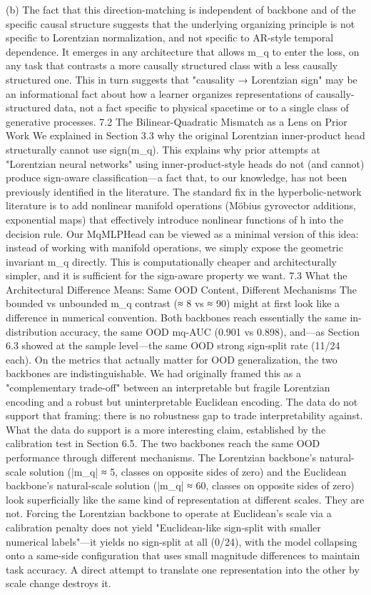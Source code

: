 (b) The fact that this direction-matching is independent of backbone and of the specific causal structure suggests that the underlying organizing principle is not specific to Lorentzian normalization, and not specific to AR-style temporal dependence. It emerges in any architecture that allows m_q to enter the loss, on any task that contrasts a more causally structured class with a less causally structured one. This in turn suggests that "causality → Lorentzian sign" may be an informational fact about how a learner organizes representations of causally-structured data, not a fact specific to physical spacetime or to a single class of generative processes.
7.2 The Bilinear-Quadratic Mismatch as a Lens on Prior Work
We explained in Section 3.3 why the original Lorentzian inner-product head structurally cannot use sign(m_q). This explains why prior attempts at "Lorentzian neural networks" using inner-product-style heads do not (and cannot) produce sign-aware classification—a fact that, to our knowledge, has not been previously identified in the literature.
The standard fix in the hyperbolic-network literature is to add nonlinear manifold operations (Möbius gyrovector additions, exponential maps) that effectively introduce nonlinear functions of h into the decision rule. Our MqMLPHead can be viewed as a minimal version of this idea: instead of working with manifold operations, we simply expose the geometric invariant m_q directly. This is computationally cheaper and architecturally simpler, and it is sufficient for the sign-aware property we want.
7.3 What the Architectural Difference Means: Same OOD Content, Different Mechanisms
The bounded vs unbounded m_q contrast (≈ 8 vs ≈ 90) might at first look like a difference in numerical convention. Both backbones reach essentially the same in-distribution accuracy, the same OOD mq-AUC (0.901 vs 0.898), and—as Section 6.3 showed at the sample level—the same OOD strong sign-split rate (11/24 each). On the metrics that actually matter for OOD generalization, the two backbones are indistinguishable. We had originally framed this as a "complementary trade-off" between an interpretable but fragile Lorentzian encoding and a robust but uninterpretable Euclidean encoding. The data do not support that framing: there is no robustness gap to trade interpretability against.
What the data do support is a more interesting claim, established by the calibration test in Section 6.5. The two backbones reach the same OOD performance through different mechanisms. The Lorentzian backbone's natural-scale solution (|m_q| ≈ 5, classes on opposite sides of zero) and the Euclidean backbone's natural-scale solution (|m_q| ≈ 60, classes on opposite sides of zero) look superficially like the same kind of representation at different scales. They are not. Forcing the Lorentzian backbone to operate at Euclidean's scale via a calibration penalty does not yield "Euclidean-like sign-split with smaller numerical labels"—it yields no sign-split at all (0/24), with the model collapsing onto a same-side configuration that uses small magnitude differences to maintain task accuracy. A direct attempt to translate one representation into the other by scale change destroys it.
